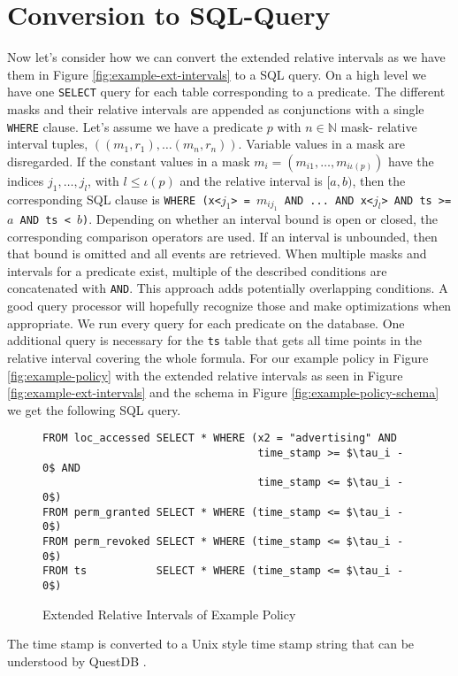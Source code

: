 \section{Conversion to SQL-Query}
Now let's consider how we can convert the extended relative intervals as we have them in Figure \ref{fig:example-ext-intervals} to a SQL query.
On a high level we have one \texttt{SELECT} query for each table corresponding to a predicate. The different masks and their relative intervals are appended as conjunctions with a single \texttt{WHERE} clause.
Let's assume we have a predicate $p$ with $n \in \mathbb{N}$ mask- relative interval tuples, $((m_1, r_1), \dots (m_n,r_n))$.
Variable values in a mask are disregarded.
If the constant values in a mask $m_i = (m_{i1}, \dots, m_{i{\iota(p)}})$ 
have the indices $j_1, \dots, j_l$, with 
$l \leq \iota(p)$
and the relative interval is $[a,b)$, then the corresponding SQL clause is \texttt{WHERE (x<$j_1$> = $m_{ij_1}$ AND ... AND x<$j_l$> AND ts >= $a$ AND ts < $b$)}.
Depending on whether an interval bound is open or closed, the corresponding comparison operators are used.
If an interval is unbounded, then that bound is omitted and all events are retrieved.
When multiple masks and intervals for a predicate exist, multiple of the described conditions are concatenated with \texttt{AND}.
This approach adds potentially overlapping conditions.
A good query processor will hopefully recognize those and make optimizations when appropriate.
We run every query for each predicate on the database.
One additional query is necessary for the \texttt{ts} table that gets all time points in the relative interval covering the whole formula.
For our example policy in Figure \ref{fig:example-policy} with the extended relative intervals as seen in Figure \ref{fig:example-ext-intervals} and the schema in Figure \ref{fig:example-policy-schema} we get the following SQL query.

\begin{figure}[H]
    \label{fig:ext-sql-query}
\begin{lstlisting}
FROM loc_accessed SELECT * WHERE (x2 = "advertising" AND
                                  time_stamp >= $\tau_i - 0$ AND
                                  time_stamp <= $\tau_i - 0$)
FROM perm_granted SELECT * WHERE (time_stamp <= $\tau_i - 0$)
FROM perm_revoked SELECT * WHERE (time_stamp <= $\tau_i - 0$)
FROM ts           SELECT * WHERE (time_stamp <= $\tau_i - 0$)
\end{lstlisting}
    \caption{Extended Relative Intervals of Example Policy}
\end{figure}

The time stamp is converted to a Unix style time stamp string that can be understood by QuestDB \cite{questdb-time-stamps}.



